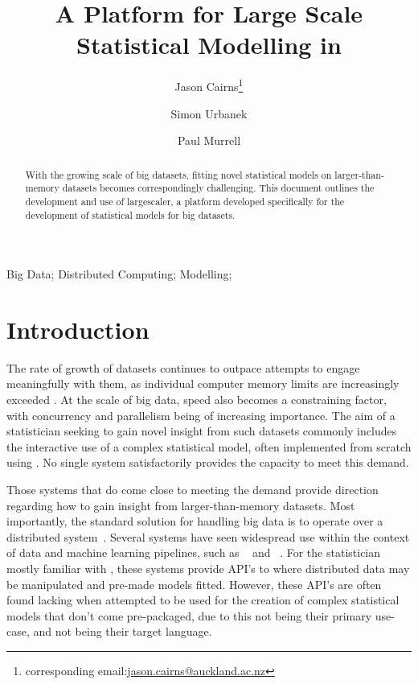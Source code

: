 \documentclass[letterpaper, inpress]{jds} %
\title{A Platform for Large Scale Statistical Modelling in \proglang{R}}
\author[1]{Jason Cairns\thanks{corresponding email:\href{mailto:jason.cairns@auckland.ac.nz}{jason.cairns@auckland.ac.nz}}}
\author[1]{Simon Urbanek}
\author[1]{Paul Murrell}
\affil[1]{Department of Statistics, University of Auckland, New Zealand}
\begin{document}
\maketitle

\begin{abstract}
With the growing scale of big datasets, fitting novel statistical models on larger-than-memory datasets becomes correspondingly challenging.
This document outlines the development and use of largescaler, a platform developed specifically for the development of statistical models for big datasets.
\end{abstract}
\begin{keywords} %
Big Data;
Distributed Computing;
Modelling;
\end{keywords}

\section{Introduction}%
\label{sec:intro}

The rate of growth of datasets continues to outpace attempts to engage meaningfully with them, as individual computer memory limits are increasingly exceeded \citep{kleppmann2017dataintensive}.
At the scale of big data, speed also becomes a constraining factor, with concurrency and parallelism being of increasing importance.
The aim of a statistician seeking to gain novel insight from such datasets commonly includes the interactive use of a complex statistical model, often implemented from scratch using .
No single system satisfactorily provides the capacity to meet this demand.

Those systems that do come close to meeting the demand provide direction regarding how to gain insight from larger-than-memory datasets.
Most importantly, the standard solution for handling big data is to operate over a distributed system~\citep{boja2012distributed}.
Several systems have seen widespread use within the context of data and machine learning pipelines, such as ~\citep{zaharia2016apache} and ~\citep{shvachko2010hadoop}.
For the statistician mostly familiar with , these systems provide API's to  where distributed data may be manipulated and pre-made models fitted.
However, these API's are often found lacking when attempted to be used for the creation of complex statistical models that don't come pre-packaged, due to this not being their primary use-case, and  not being their target language.
\end{document}
